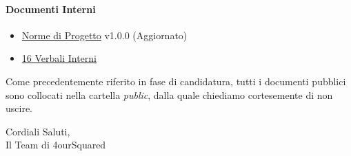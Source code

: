 \documentclass[12pt, a4paper]{article}
\begin{document}
\paragraph{Documenti Interni}
\begin{itemize}
    \item \href{https://github.com/4ourSquared/LumosMinima/tree/main/public/interni/norme_di_progetto_v1.pdf}{Norme di Progetto} v1.0.0 (Aggiornato)
    \item \href{https://github.com/4ourSquared/LumosMinima/tree/main/public/interni/verbali}{16 Verbali Interni}
\end{itemize}

Come precedentemente riferito in fase di candidatura, tutti i documenti pubblici sono collocati nella cartella \textit{public}, dalla quale chiediamo cortesemente di non uscire.

\begin{flushright}
    Cordiali Saluti,\\
    Il Team di 4ourSquared
    \end{flushright}
\end{document}
